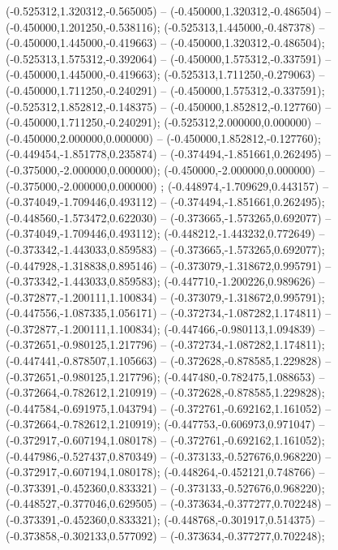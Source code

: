  (-0.525312,1.320312,-0.565005) -- (-0.450000,1.320312,-0.486504) -- (-0.450000,1.201250,-0.538116);
 (-0.525313,1.445000,-0.487378) -- (-0.450000,1.445000,-0.419663) -- (-0.450000,1.320312,-0.486504);
 (-0.525313,1.575312,-0.392064) -- (-0.450000,1.575312,-0.337591) -- (-0.450000,1.445000,-0.419663);
 (-0.525313,1.711250,-0.279063) -- (-0.450000,1.711250,-0.240291) -- (-0.450000,1.575312,-0.337591);
 (-0.525312,1.852812,-0.148375) -- (-0.450000,1.852812,-0.127760) -- (-0.450000,1.711250,-0.240291);
 (-0.525312,2.000000,0.000000) -- (-0.450000,2.000000,0.000000) -- (-0.450000,1.852812,-0.127760);
 (-0.449454,-1.851778,0.235874) -- (-0.374494,-1.851661,0.262495) -- (-0.375000,-2.000000,0.000000);
 (-0.450000,-2.000000,0.000000) -- (-0.375000,-2.000000,0.000000) ;
 (-0.448974,-1.709629,0.443157) -- (-0.374049,-1.709446,0.493112) -- (-0.374494,-1.851661,0.262495);
 (-0.448560,-1.573472,0.622030) -- (-0.373665,-1.573265,0.692077) -- (-0.374049,-1.709446,0.493112);
 (-0.448212,-1.443232,0.772649) -- (-0.373342,-1.443033,0.859583) -- (-0.373665,-1.573265,0.692077);
 (-0.447928,-1.318838,0.895146) -- (-0.373079,-1.318672,0.995791) -- (-0.373342,-1.443033,0.859583);
 (-0.447710,-1.200226,0.989626) -- (-0.372877,-1.200111,1.100834) -- (-0.373079,-1.318672,0.995791);
 (-0.447556,-1.087335,1.056171) -- (-0.372734,-1.087282,1.174811) -- (-0.372877,-1.200111,1.100834);
 (-0.447466,-0.980113,1.094839) -- (-0.372651,-0.980125,1.217796) -- (-0.372734,-1.087282,1.174811);
 (-0.447441,-0.878507,1.105663) -- (-0.372628,-0.878585,1.229828) -- (-0.372651,-0.980125,1.217796);
 (-0.447480,-0.782475,1.088653) -- (-0.372664,-0.782612,1.210919) -- (-0.372628,-0.878585,1.229828);
 (-0.447584,-0.691975,1.043794) -- (-0.372761,-0.692162,1.161052) -- (-0.372664,-0.782612,1.210919);
 (-0.447753,-0.606973,0.971047) -- (-0.372917,-0.607194,1.080178) -- (-0.372761,-0.692162,1.161052);
 (-0.447986,-0.527437,0.870349) -- (-0.373133,-0.527676,0.968220) -- (-0.372917,-0.607194,1.080178);
 (-0.448264,-0.452121,0.748766) -- (-0.373391,-0.452360,0.833321) -- (-0.373133,-0.527676,0.968220);
 (-0.448527,-0.377046,0.629505) -- (-0.373634,-0.377277,0.702248) -- (-0.373391,-0.452360,0.833321);
 (-0.448768,-0.301917,0.514375) -- (-0.373858,-0.302133,0.577092) -- (-0.373634,-0.377277,0.702248);
